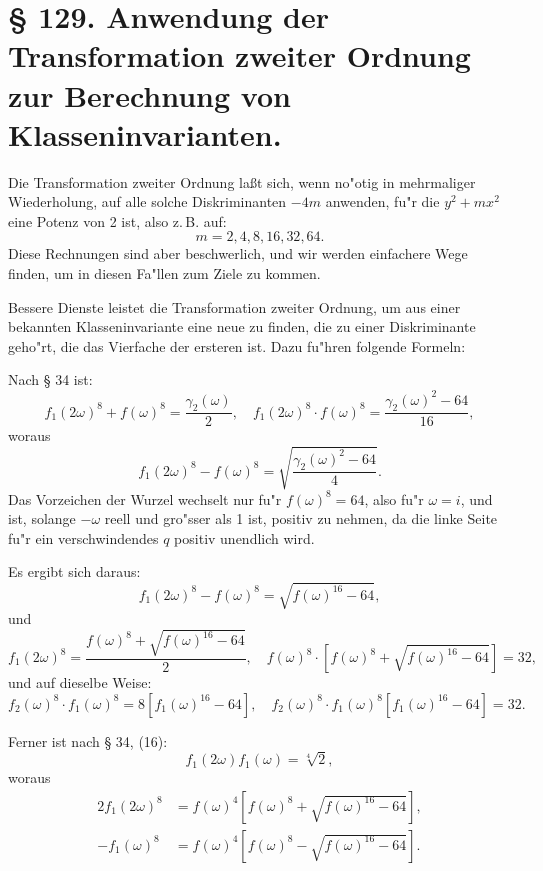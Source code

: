 \documentclass[12pt,a4paper]{article}
\theoremstyle{plain}
\theoremstyle{definition}
\theoremstyle{remark}
\begin{document}
\newpage

\section*{\S{} 129. Anwendung der Transformation zweiter Ordnung zur Berechnung von Klasseninvarianten.}

Die Transformation zweiter Ordnung la\ss{}t sich, wenn no"otig in mehrmaliger Wiederholung, auf alle solche Diskriminanten $-4m$ anwenden, fu"r die $y^2 + mx^2$ eine Potenz von 2 ist, also z.\,B. auf:
\[
m = 2, 4, 8, 16, 32, 64.
\]
Diese Rechnungen sind aber beschwerlich, und wir werden einfachere Wege finden, um in diesen Fa"llen zum Ziele zu kommen.

Bessere Dienste leistet die Transformation zweiter Ordnung, um aus einer bekannten Klasseninvariante eine neue zu finden, die zu einer Diskriminante geho"rt, die das Vierfache der ersteren ist. Dazu fu"hren folgende Formeln:

Nach \S{} 34 ist:
\[
f_1(2\omega)^8 + f(\omega)^8 = \frac{\gamma_2(\omega)}{2}, \quad f_1(2\omega)^8 \cdot f(\omega)^8 = \frac{\gamma_2(\omega)^2 - 64}{16},
\]
woraus
\[
f_1(2\omega)^8 - f(\omega)^8 = \sqrt{\frac{\gamma_2(\omega)^2 - 64}{4}}.
\]
Das Vorzeichen der Wurzel wechselt nur fu"r $f(\omega)^8 = 64$, also fu"r $\omega = i$, und ist, solange $-\omega$ reell und gro"sser als 1 ist, positiv zu nehmen, da die linke Seite fu"r ein verschwindendes $q$ positiv unendlich wird.

Es ergibt sich daraus:
\[
f_1(2\omega)^8 - f(\omega)^8 = \sqrt{f(\omega)^{16} - 64},
\]
und
\[
f_1(2\omega)^8 = \frac{f(\omega)^8 + \sqrt{f(\omega)^{16} - 64}}{2}, \quad f(\omega)^8 \cdot [f(\omega)^8 + \sqrt{f(\omega)^{16} - 64}] = 32,
\]
und auf dieselbe Weise:
\[
f_2(\omega)^8 \cdot f_1(\omega)^8 = 8[f_1(\omega)^{16} - 64], \quad f_2(\omega)^8 \cdot f_1(\omega)^8 [f_1(\omega)^{16} - 64] = 32.
\]

Ferner ist nach \S{} 34, (16):
\[
f_1(2\omega) f_1(\omega) = \sqrt[4]{2},
\]
woraus
\begin{equation}\label{eq:129_1}
\begin{aligned}
2f_1(2\omega)^8 &= f(\omega)^4 [f(\omega)^8 + \sqrt{f(\omega)^{16} - 64}], \\
-f_1(\omega)^8 &= f(\omega)^4 [f(\omega)^8 - \sqrt{f(\omega)^{16} - 64}].
\end{aligned}
\end{equation}
\end{document}
